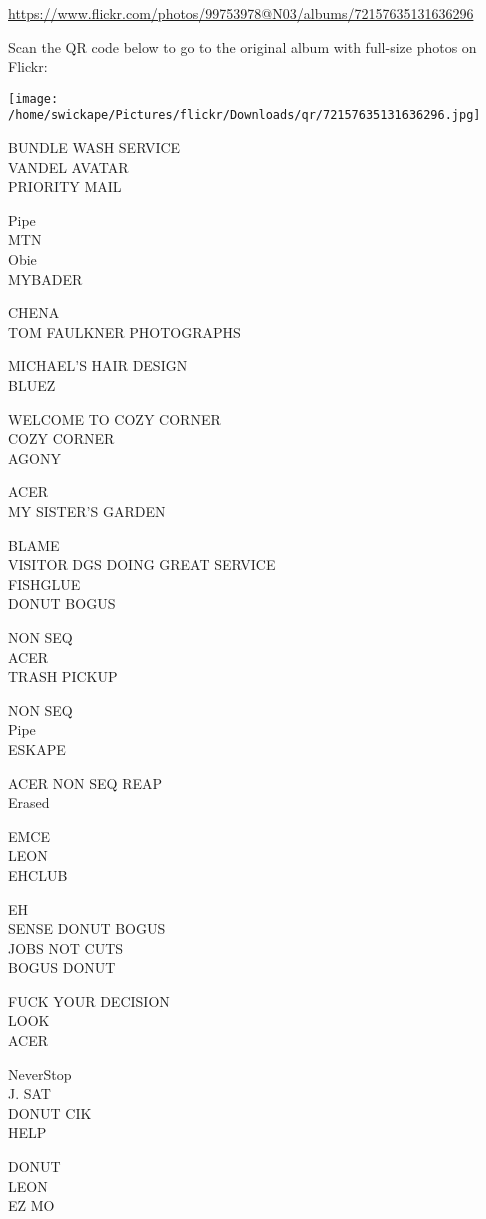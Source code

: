 \documentclass[10pt,letterpaper]{article}
\begin{document}
\url{https://www.flickr.com/photos/99753978@N03/albums/72157635131636296}

Scan the QR code below to go to the original album with full-size photos on Flickr:

\texttt{[image: /home/swickape/Pictures/flickr/Downloads/qr/72157635131636296.jpg]}
\pagebreak

BUNDLE WASH SERVICE\\
VANDEL AVATAR\\
PRIORITY MAIL

Pipe\\
MTN\\
Obie\\
MYBADER

CHENA\\
TOM FAULKNER PHOTOGRAPHS

MICHAEL'S HAIR DESIGN\\
BLUEZ

WELCOME TO COZY CORNER\\
COZY CORNER\\
AGONY

ACER\\
MY SISTER'S GARDEN

BLAME\\
VISITOR DGS DOING GREAT SERVICE\\
FISHGLUE\\
DONUT BOGUS

NON SEQ\\
ACER\\
TRASH PICKUP

NON SEQ\\
Pipe\\
ESKAPE

ACER NON SEQ REAP\\
Erased

EMCE\\
LEON\\
EHCLUB

EH\\
SENSE DONUT BOGUS\\
JOBS NOT CUTS\\
BOGUS DONUT

FUCK YOUR DECISION\\
LOOK\\
ACER

NeverStop\\
J. SAT\\
DONUT CIK\\
HELP

DONUT\\
LEON\\
EZ MO
\end{document}
